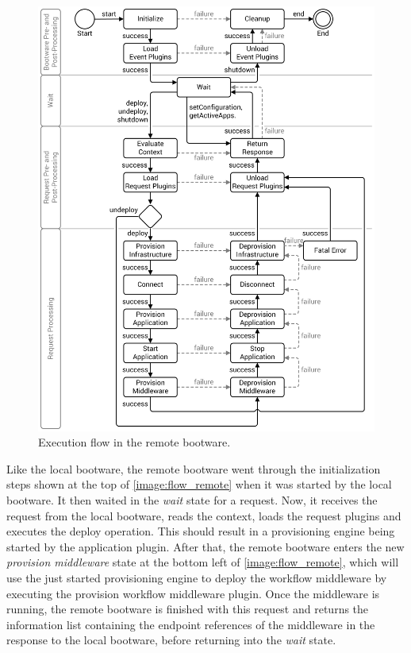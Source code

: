 \begin{figure}[!htbp]
	\centering
	\includegraphics[resolution=600]{design/assets/flow_remote}
	\caption{Execution flow in the remote bootware.}
	\label{image:flow_remote}
\end{figure}

Like the local bootware, the remote bootware went through the initialization steps shown at the top of \autoref{image:flow_remote} when it was started by the local bootware.
It then waited in the \textit{wait} state for a request.
Now, it receives the request from the local bootware, reads the context, loads the request plugins and executes the deploy operation.
This should result in a provisioning engine being started by the application plugin.
After that, the remote bootware enters the new \textit{provision middleware} state at the bottom left of \autoref{image:flow_remote}, which will use the just started provisioning engine to deploy the workflow middleware by executing the provision workflow middleware plugin.
Once the middleware is running, the remote bootware is finished with this request and returns the information list containing the endpoint references of the middleware in the response to the local bootware, before returning into the \textit{wait} state.

